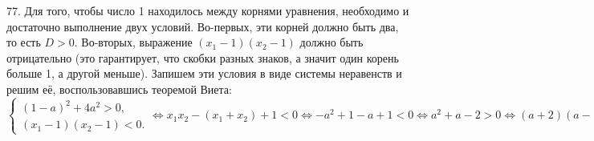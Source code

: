 77. Для того, чтобы число 1 находилось между корнями уравнения, необходимо и достаточно выполнение двух условий. Во-первых, эти корней должно быть два, то есть $D>0.$ Во-вторых, выражение $(x_1-1)(x_2-1)$ должно быть отрицательно (это гарантирует, что скобки разных знаков, а значит один корень больше 1, а другой меньше). Запишем эти условия в виде системы неравенств и решим её, воспользовавшись теоремой Виета:\\
$\begin{cases}(1-a)^2+4a^2>0,\\ (x_1-1)(x_2-1)<0.\end{cases}\Leftrightarrow x_1x_2-(x_1+x_2)+1<0\Leftrightarrow
-a^2+1-a+1<0\Leftrightarrow a^2+a-2>0\Leftrightarrow (a+2)(a-1)>0\Leftrightarrow a\in (-\infty;-2)\cup(1;+\infty).$\\
